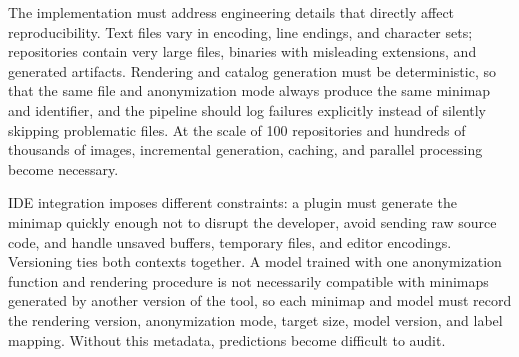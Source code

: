 The implementation must address engineering details that directly affect
reproducibility. Text files vary in encoding, line endings, and character sets;
repositories contain very large files, binaries with misleading extensions, and
generated artifacts. Rendering and catalog generation must be deterministic, so
that the same file and anonymization mode always produce the same minimap and
identifier, and the pipeline should log failures explicitly instead of silently
skipping problematic files. At the scale of 100 repositories and hundreds of
thousands of images, incremental generation, caching, and parallel processing
become necessary.

IDE integration imposes different constraints: a plugin must generate the
minimap quickly enough not to disrupt the developer, avoid sending raw source
code, and handle unsaved buffers, temporary files, and editor encodings.
Versioning ties both contexts together. A model trained with one anonymization
function and rendering procedure is not necessarily compatible with minimaps
generated by another version of the tool, so each minimap and model must record
the rendering version, anonymization mode, target size, model version, and
label mapping. Without this metadata, predictions become difficult to audit.
